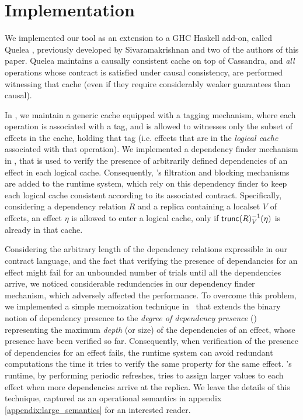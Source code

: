 \section{Implementation}
\label{sec:alg}
We implemented our tool as an extension to a GHC Haskell add-on, called
Quelea 
\cite{quelea},
previously developed by Sivaramakrishnan and two of the authors of this paper.
Quelea maintains a causally consistent cache on top of Cassandra, and \emph{all} operations whose contract is satisfied under causal
consistency, are performed witnessing that cache (even if they require considerably
weaker guarantees than causal).

In \tool, we maintain a generic cache equipped with a tagging mechanism,
where each operation is associated with a tag, and is allowed to witnesses only the subset of effects in the
cache, holding that tag (i.e. effects that are in the \emph{logical
cache} associated with that operation). We implemented a dependency finder mechanism in
\tool, that is used to verify the presence of arbitrarily defined dependencies of an
effect in each logical cache. Consequently, \tool's filtration and blocking
mechanisms are added to the runtime system, which rely on this dependency finder to keep each logical cache
consistent according to its associated contract. Specifically, 
considering a dependency relation $R$ and a replica containing a localset $V$
of effects, an effect $\eta$ is allowed to enter a logical cache, only if
$\trunc{R}_V^{-1}(\eta)$ is already in that cache. 


Considering the arbitrary length of the dependency relations expressible
in our contract language, and the fact that verifying the presence of
dependancies for an effect might fail for an unbounded number of trials
until all the dependencies arrive, we noticed considerable redundencies
in our dependency finder mechanism, which adversely affected the
performance.
To overcome this problem, we implemented a simple memoization technique in \tool\
that extends the binary notion of dependency presence to the
\emph{degree of dependency presence} (\DDP{}) representing 
the maximum \emph{depth} (or size) of the dependencies of an effect, whose presence have been
verified so far. 
Consequently, when verification of the presence of
dependencies for an effect fails, the runtime system can avoid redundant
computations the time it tries to verify the same property for the
same effect.
\tool's runtime, by performing
periodic \DDP{} refreshes, tries to assign larger \DDP{} values to each effect
when more dependencies arrive at the replica. We leave the details of
this technique, captured as an operational semantics in 
appendix \ref{appendix:large_semantics} for an interested reader.








